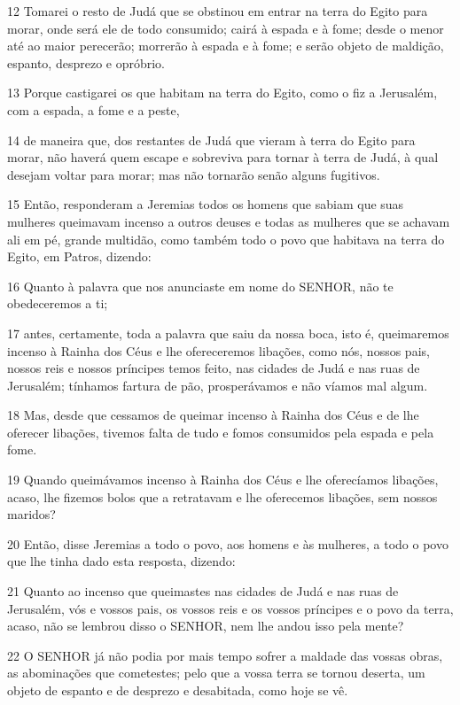 \par 12 Tomarei o resto de Judá que se obstinou em entrar na terra do Egito para morar, onde será ele de todo consumido; cairá à espada e à fome; desde o menor até ao maior perecerão; morrerão à espada e à fome; e serão objeto de maldição, espanto, desprezo e opróbrio.
\par 13 Porque castigarei os que habitam na terra do Egito, como o fiz a Jerusalém, com a espada, a fome e a peste,
\par 14 de maneira que, dos restantes de Judá que vieram à terra do Egito para morar, não haverá quem escape e sobreviva para tornar à terra de Judá, à qual desejam voltar para morar; mas não tornarão senão alguns fugitivos.
\par 15 Então, responderam a Jeremias todos os homens que sabiam que suas mulheres queimavam incenso a outros deuses e todas as mulheres que se achavam ali em pé, grande multidão, como também todo o povo que habitava na terra do Egito, em Patros, dizendo:
\par 16 Quanto à palavra que nos anunciaste em nome do SENHOR, não te obedeceremos a ti;
\par 17 antes, certamente, toda a palavra que saiu da nossa boca, isto é, queimaremos incenso à Rainha dos Céus e lhe ofereceremos libações, como nós, nossos pais, nossos reis e nossos príncipes temos feito, nas cidades de Judá e nas ruas de Jerusalém; tínhamos fartura de pão, prosperávamos e não víamos mal algum.
\par 18 Mas, desde que cessamos de queimar incenso à Rainha dos Céus e de lhe oferecer libações, tivemos falta de tudo e fomos consumidos pela espada e pela fome.
\par 19 Quando queimávamos incenso à Rainha dos Céus e lhe oferecíamos libações, acaso, lhe fizemos bolos que a retratavam e lhe oferecemos libações, sem nossos maridos?
\par 20 Então, disse Jeremias a todo o povo, aos homens e às mulheres, a todo o povo que lhe tinha dado esta resposta, dizendo:
\par 21 Quanto ao incenso que queimastes nas cidades de Judá e nas ruas de Jerusalém, vós e vossos pais, os vossos reis e os vossos príncipes e o povo da terra, acaso, não se lembrou disso o SENHOR, nem lhe andou isso pela mente?
\par 22 O SENHOR já não podia por mais tempo sofrer a maldade das vossas obras, as abominações que cometestes; pelo que a vossa terra se tornou deserta, um objeto de espanto e de desprezo e desabitada, como hoje se vê.
